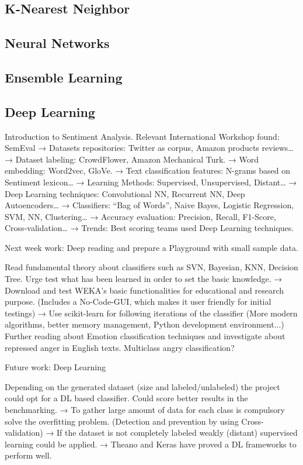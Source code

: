 \subsection{K-Nearest Neighbor}

\subsection{Neural Networks}

\subsection{Ensemble Learning}
\label{subsec:ensemble_learning]}

\cite{ensemble2009Polikar}

\fi

\subsection{Deep Learning}
\label{subsec:deep_learning}

Introduction to Sentiment Analysis.
Relevant International Workshop found: SemEval
→ Datasets repositories: Twitter as corpus, Amazon products reviews…
→ Dataset labeling: CrowdFlower, Amazon Mechanical Turk.
→ Word embedding: Word2vec, GloVe.
→ Text classification features: N-grams based on Sentiment lexicon…
→ Learning Methods: Supervised, Unsupervised, Distant…
→ Deep Learning techniques: Convolutional NN, Recurrent NN, Deep Autoencoders…
→ Classifiers: “Bag of Words”, Naive Bayes, Logistic Regression, SVM, NN, Clustering…
→ Accuracy evaluation: Precision, Recall, F1-Score, Cross-validation…
→ Trends: Best scoring teams used Deep Learning techniques.

Next week work: Deep reading and prepare a Playground with small sample data.

Read fundamental theory about classifiers such as SVN, Bayesian, KNN, Decision Tree.
Urge test what has been learned in order to set the basic knowledge.
→ Download and test WEKA’s basic functionalities for educational and research purpose. (Includes a No-Code-GUI, which makes it user friendly for initial testings)
→ Use scikit-learn for following iterations of the classifier (More modern algorithms, better memory management, Python development environment...)
Further reading about Emotion classification techniques and investigate about repressed anger in English texts. 
Multiclass angry classification?

Future work: Deep Learning

Depending on the generated dataset (size and labeled/unlabeled) the project could opt for a DL based classifier.
Could score better results in the benchmarking.
→ To gather large amount of data for each class is compulsory solve the overfitting problem. (Detection and prevention by using Cross-validation)
→ If the dataset is not completely labeled weakly (distant) supervised learning could be applied.
→ Theano and Keras have proved a DL frameworks to perform well.